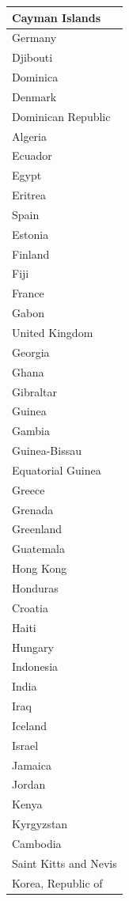 \documentclass[]{article}
\begin{document}
\begin{table}
\begin{tabular}[t]{l}
\hline
Cayman Islands\\
\hline
Germany\\
\hline
Djibouti\\
\hline
Dominica\\
\hline
Denmark\\
\hline
Dominican Republic\\
\hline
Algeria\\
\hline
Ecuador\\
\hline
Egypt\\
\hline
Eritrea\\
\hline
Spain\\
\hline
Estonia\\
\hline
Finland\\
\hline
Fiji\\
\hline
France\\
\hline
Gabon\\
\hline
United Kingdom\\
\hline
Georgia\\
\hline
Ghana\\
\hline
Gibraltar\\
\hline
Guinea\\
\hline
Gambia\\
\hline
Guinea-Bissau\\
\hline
Equatorial Guinea\\
\hline
Greece\\
\hline
Grenada\\
\hline
Greenland\\
\hline
Guatemala\\
\hline
Hong Kong\\
\hline
Honduras\\
\hline
Croatia\\
\hline
Haiti\\
\hline
Hungary\\
\hline
Indonesia\\
\hline
India\\
\hline
Iraq\\
\hline
Iceland\\
\hline
Israel\\
\hline
Jamaica\\
\hline
Jordan\\
\hline
Kenya\\
\hline
Kyrgyzstan\\
\hline
Cambodia\\
\hline
Saint Kitts and Nevis\\
\hline
Korea, Republic of\\

\end{tabular}
\end{table}
\end{document}

